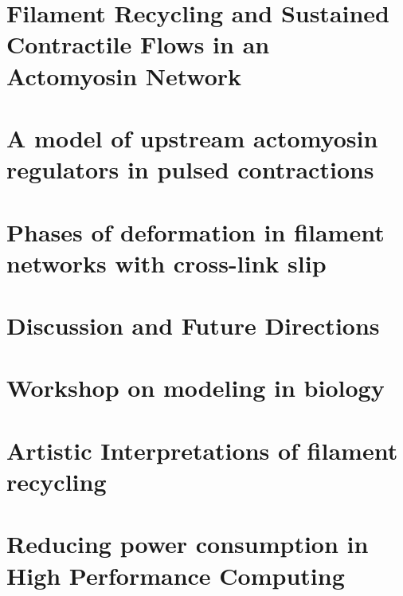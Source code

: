 \documentclass{easychithesis}
\begin{document}
\chapter{Filament Recycling and Sustained Contractile Flows in an Actomyosin Network}


\chapter{A model of upstream actomyosin regulators in pulsed contractions}

\chapter{Phases of deformation in filament networks with cross-link slip}


\chapter{Discussion and Future Directions}

%
%
\appendix
\chapter{Workshop on modeling in biology}


\chapter{Artistic Interpretations of filament recycling}

\chapter{Reducing power consumption in High Performance Computing}

%
%

\singlespacing
\pagebreak


\end{document}
